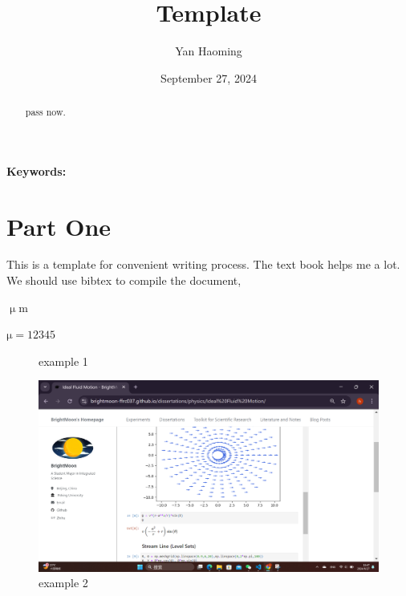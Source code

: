 \documentclass[UTF-8]{article}
\title{Template}
\author{Yan Haoming}
\date{September 27, 2024}
\begin{document}
\maketitle
\begin{abstract}
    pass now.
\end{abstract}
\textbf{Keywords: }
\section{Part One}
This is a template for convenient writing process.
The text book helps\cite{TheCell} me a lot.
We should use bibtex to compile the document,


$\upmu\mathrm{m}$

$\mathrm{\mu}=12345$

 \begin{figure}
    \centering
    \caption{example 1}  
    \label{example 1}
 \end{figure}

\begin{figure}
    \centering
    \includegraphics[width=0.7\linewidth]{../Figures/example 3.png}
    \caption{example 2}
    \label{example 2}
\end{figure}
\end{document}
